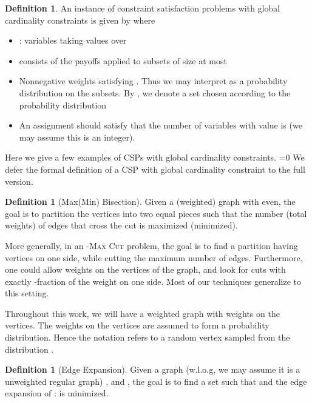 \documentclass[11pt]{article}
\def\full{1}
\theoremstyle{definition}
\newtheorem{definition}[theorem]{Definition}
\newcommand{\problemmacro}[1]{\texorpdfstring{\textsc{#1}}{#1}\xspace}
\newcommand{\maxcut}{\problemmacro{Max Cut}}
\numberwithin{equation}{section}
\begin{document}
\begin{definition}
An instance  of constraint satisfaction problems with global
cardinality constraints  is given by  where
\begin{itemize}
\item : variables taking values over 
\item  consists of the payoffs applied to subsets  of size at most 
\item Nonnegative weights  satisfying . Thus we may interpret  as a probability distribution on the subsets. By , we denote a set  chosen according to the probability distribution 
\item An assignment should satisfy that the number of variables with value  is  (we may assume this is an integer).
\end{itemize}
\end{definition}
\fi
Here we give a few examples of CSPs with global cardinality
constraints.
\ifnum\full=0
We defer the formal definition of a CSP with global
cardinality constraint to the full version.
\fi
\begin{definition} [Max(Min) Bisection]
Given a (weighted) graph  with  even, the goal is to partition the vertices into two equal pieces such that the number (total weights) of edges that cross the cut is maximized (minimized).
\end{definition}
More generally, in an -\maxcut problem, the goal is to find a
partition having  vertices on one side, while cutting the
maximum number of edges.  Furthermore, one could allow weights on the
vertices of the graph, and look for cuts with exactly
-fraction of the weight on one side.  Most of our techniques
generalize to this setting.

Throughout this work, we will have a weighted graph  with weights
 on the vertices.  The weights on the vertices are assumed to form
a probability distribution.  Hence the notation  refers to
a random vertex sampled from the distribution .

\begin{definition} [Edge Expansion]
Given a graph (w.l.o.g, we may assume it is a unweighted regular graph) , and , the goal is to find a set  such that  and the edge expansion of :  is minimized.
\end{definition}
\end{document}
